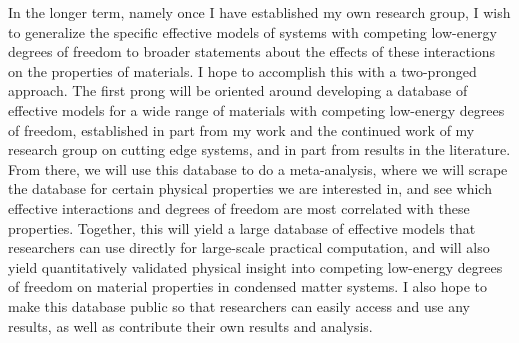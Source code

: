 \documentclass{article}
\begin{document}
In the longer term, namely once I have established my own research group, I wish to generalize the specific effective models of systems with competing low-energy degrees of freedom to broader statements about the effects of these interactions on the properties of materials.
I hope to accomplish this with a two-pronged approach.
The first prong will be oriented around developing a database of effective models for a wide range of materials with competing low-energy degrees of freedom, established in part from my work and the continued work of my research group on cutting edge systems, and in part from results in the literature.
From there, we will use this database to do a meta-analysis, where we will scrape the database for certain physical properties we are interested in, and see which effective interactions and degrees of freedom are most correlated with these properties.
Together, this will yield a large database of effective models that researchers can use directly for large-scale practical computation, and will also yield quantitatively validated physical insight into competing low-energy degrees of freedom on material properties in condensed matter systems. 
I also hope to make this database public so that researchers can easily access and use any results, as well as contribute their own results and analysis.
\end{document}
